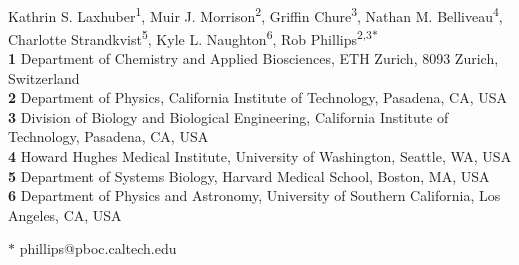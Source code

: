 \documentclass[10pt,letterpaper]{article}
\begin{document}
	\vspace*{0.2in}
	
	\begin{flushleft}
		{\Large
			\textbf{} %
		}
		\newline
		\\
		Kathrin S. Laxhuber\textsuperscript{1},
		Muir J. Morrison\textsuperscript{2},
		Griffin Chure\textsuperscript{3},
		Nathan M. Belliveau\textsuperscript{4},
		Charlotte Strandkvist\textsuperscript{5},
		Kyle L. Naughton\textsuperscript{6},
		Rob Phillips\textsuperscript{2,3$\ast$}
		\\
		\bigskip
		\textbf{1} Department of Chemistry and Applied Biosciences, ETH Zurich, 8093 Zurich, Switzerland
		\\
		\textbf{2} Department of Physics, California Institute of Technology, Pasadena, CA, USA
		\\
		\textbf{3} Division of Biology and Biological Engineering, California Institute of Technology, Pasadena, CA, USA
		\\
		\textbf{4} Howard Hughes Medical Institute, University of Washington, Seattle, WA, USA
		\\
		\textbf{5} Department of Systems Biology, Harvard Medical School, Boston, MA, USA
		\\
		\textbf{6} Department of Physics and Astronomy, University of Southern California, Los Angeles, CA, USA
		\\
		\bigskip
		
		
		
		
		$\ast$ phillips@pboc.caltech.edu
		
	\end{flushleft}
\end{document}
